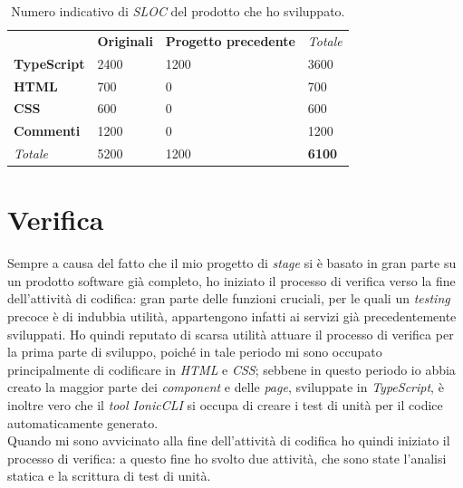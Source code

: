 \begin{table}[h]
  \label{tab:sloc}
  \begin{center}
  \begin{tabularx}{\textwidth}{llll}
    & \textbf{Originali}        & \textbf{Progetto precedente} & \textit{Totale}                    \\ \cline{2-4}
\multicolumn{1}{l|}{\textbf{TypeScript}} & \multicolumn{1}{l|}{2400} & \multicolumn{1}{l|}{1200}     & \multicolumn{1}{l|}{3600}          \\ \cline{2-4}
\multicolumn{1}{l|}{\textbf{HTML}}       & \multicolumn{1}{l|}{700}  & \multicolumn{1}{l|}{0}       & \multicolumn{1}{l|}{700}           \\ \cline{2-4}
\multicolumn{1}{l|}{\textbf{CSS}}        & \multicolumn{1}{l|}{600}  & \multicolumn{1}{l|}{0}       & \multicolumn{1}{l|}{600}           \\ \cline{2-4}
\multicolumn{1}{l|}{\textbf{Commenti}}   & \multicolumn{1}{l|}{1200} & \multicolumn{1}{l|}{0}       & \multicolumn{1}{l|}{1200}          \\ \cline{2-4}
\multicolumn{1}{l|}{\textit{Totale}}     & \multicolumn{1}{l|}{5200} & \multicolumn{1}{l|}{1200}     & \multicolumn{1}{l|}{\textbf{6100}} \\ \cline{2-4}
\end{tabularx}
  \end{center}
\caption{Numero indicativo di \textit{SLOC} del prodotto che ho sviluppato.}
\end{table}



\section{Verifica}

Sempre a causa del fatto che il mio progetto di \textit{stage} si è basato in gran parte su un prodotto software già completo, ho iniziato il processo di verifica verso la fine dell'attività di codifica: gran parte delle funzioni cruciali, per le quali un \textit{testing} precoce è di indubbia utilità, appartengono infatti ai servizi già precedentemente sviluppati. Ho quindi reputato di scarsa utilità attuare il processo di verifica per la prima parte di sviluppo, poiché in tale periodo mi sono occupato principalmente di codificare in \textit{HTML} e \textit{CSS}; sebbene in questo periodo io abbia creato la maggior parte dei \textit{component} e delle \textit{page}, sviluppate in \textit{TypeScript}, è inoltre vero che il \textit{tool IonicCLI} si occupa di creare i test di unità per il codice automaticamente generato. \\
Quando mi sono avvicinato alla fine dell'attività di codifica ho quindi iniziato il processo di verifica: a questo fine ho svolto due attività, che sono state l'analisi statica e la scrittura di test di unità.


